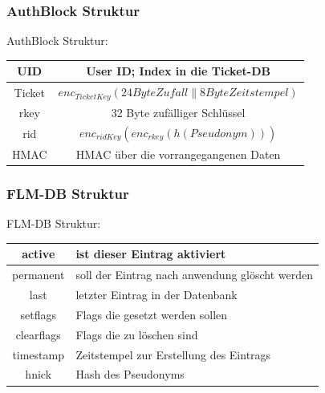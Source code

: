 \begin{frame}
	\frametitle{AuthBlock Struktur}
	AuthBlock Struktur:
\begin{tabular}{|c|c|}
\hline UID & User ID; Index in die Ticket-DB \\ 
\hline Ticket   & $enc_{TicketKey}(24 Byte Zufall \parallel 8 Byte Zeitstempel)$ \\ 
\hline rkey     & 32 Byte zufälliger Schlüssel \\ 
\hline rid      & $enc_{ridKey}\left(enc_{rkey}\left(h\left(Pseudonym\right)\right)\right)$ \\ 
\hline HMAC     & HMAC über die vorrangegangenen Daten \\ 
\hline 
\end{tabular} 
\end{frame}


\begin{frame}
	\frametitle{FLM-DB Struktur}
	FLM-DB Struktur:
\begin{tabular}{|c|p{7cm}|}
\hline active     & ist dieser Eintrag aktiviert \\ 
\hline permanent  & soll der Eintrag nach anwendung glöscht werden \\ 
\hline last       & letzter Eintrag in der Datenbank \\ 
\hline setflags   & Flags die gesetzt werden sollen \\ 
\hline clearflags & Flags die zu löschen sind \\
\hline timestamp  & Zeitstempel zur Erstellung des Eintrags \\
\hline hnick      & Hash des Pseudonyms \\
\hline 
\end{tabular} 
\end{frame}
